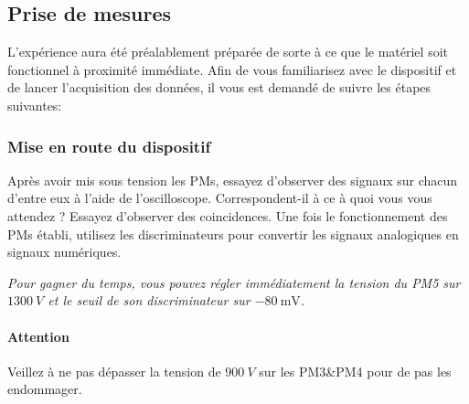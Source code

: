 \subsection{Prise de mesures}

L'expérience aura été préalablement préparée de sorte à ce que le matériel soit fonctionnel à proximité immédiate.
Afin de vous familiarisez avec le dispositif et de lancer l'acquisition des données, il vous est demandé de suivre les étapes suivantes:

\begin{center}
\end{center}

\subsubsection{Mise en route du dispositif}

Après avoir mis sous tension les PMs, essayez d'observer des signaux sur chacun d'entre eux à l'aide de l'oscilloscope.
Correspondent-il à ce à quoi vous vous attendez ?
Essayez d'observer des coincidences.
Une fois le fonctionnement des PMs établi, utilisez les discriminateurs pour convertir les signaux analogiques en signaux numériques.

\bigskip

\textit{Pour gagner du temps, vous pouvez régler immédiatement la tension du PM5 sur \(\SI{1300}{V}\) et le seuil de son discriminateur sur \(\SI{-80}{\mV}\).}

\paragraph{Attention} Veillez à ne pas dépasser la tension de \(\SI{900}{V}\) sur les PM3\&PM4 pour de pas les endommager.

